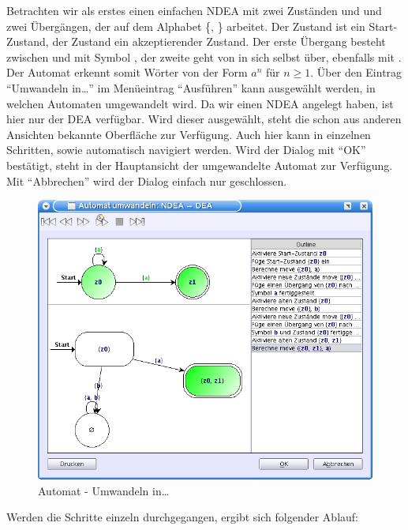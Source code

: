 Betrachten wir als erstes einen einfachen NDEA mit zwei Zuständen  und
 und zwei Übergängen, der auf dem Alphabet \{, \}
arbeitet. Der Zustand  ist ein Start-Zustand, der Zustand 
ein akzeptierender Zustand. Der erste Übergang besteht zwischen  und
 mit Symbol , der zweite geht von  in sich selbst
über, ebenfalls mit . Der Automat erkennt somit Wörter von der Form
$a^n$ für $n \geq 1$. Über den Eintrag "`Umwandeln in\ldots"' im Menüeintrag
"`Ausführen"' kann ausgewählt werden, in welchen Automaten umgewandelt wird. Da
wir einen NDEA angelegt haben, ist hier nur der DEA verfügbar. Wird dieser
ausgewählt, steht die schon aus anderen Ansichten bekannte Oberfläche zur
Verfügung. Auch hier kann in einzelnen Schritten, sowie automatisch navigiert
werden. Wird der Dialog mit "`OK"' bestätigt, steht in der Hauptansicht der
umgewandelte Automat zur Verfügung. Mit "`Abbrechen"' wird der Dialog einfach nur
geschlossen.\vspace{10pt}

\begin{figure}[h!]
\begin{center}
\includegraphics[width=12cm]{../images/convert_to.png}
\caption{Automat - Umwandeln in\ldots}
\end{center}
\end{figure}

\newpage
Werden die Schritte einzeln durchgegangen, ergibt sich folgender Ablauf:

